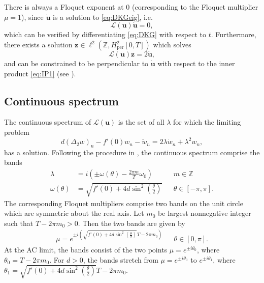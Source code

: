 \documentclass[12pt,reqno]{amsart}
\def\Z{{\mathbb Z}}
\def\per{\textrm{per}}
\def\calL{\mathcal{L}}
\newcommand{\uvec}{\mathbf{u}}
\newcommand{\zvec}{\mathbf{z}}
\begin{document}
There is always a Floquet exponent at 0 (corresponding to the Floquet multiplier $\mu = 1$), since $\dot{\uvec}$ is a solution to \cref{eq:DKGeig}, i.e.
\begin{equation}\label{eq:Lkernel1}
\calL(\uvec)\dot{\uvec} = 0,
\end{equation}
which can be verified by differentiating \cref{eq:DKG} with respect to $t$. Furthermore, there exists a solution $\zvec \in \ell^2(\Z, H^2_\per[0,T])$ which solves 
\begin{equation}
\calL(\uvec)\zvec = 2 \ddot{\uvec},
\end{equation}
and can be constrained to be perpendicular to $\dot{\uvec}$ with respect to the inner product \cref{eq:IP1} (see \cite[Section 3]{Pelinovsky2012}).

\subsection{Continuous spectrum}

The continuous spectrum of $\calL(\uvec)$ is the set of all $\lambda$ for which the limiting problem 
\begin{equation}\label{eq:DKGeigcont}
d (\Delta_2 w)_n - f'(0)w_n - \ddot{w}_n = 2 \lambda \dot{w}_n + \lambda^2 w_n,
\end{equation}
has a solution. Following the procedure in \cite[Section 2.1]{cuevas-maraver2016}, the continuous spectrum comprise the bands
\begin{equation}
\begin{aligned}
\lambda &= i\left( \pm \omega(\theta) - \frac{2 \pi m}{T} \omega_0 \right) && m \in \Z \\
\omega(\theta) &= \sqrt{ f'(0) + 4 d \sin^2\left( \frac{\theta}{2} \right) } && \theta \in [-\pi, \pi].
\end{aligned}
\end{equation}
The corresponding Floquet multipliers comprise two bands on the unit circle which are symmetric about the real axis. Let $m_0$ be largest nonnegative integer such that $T - 2 \pi m_0 > 0$. Then the two bands are given by
\begin{equation}
\begin{aligned}
\mu = e^{\pm i \left( \sqrt{f'(0) + 4 d \sin^2 \left(\frac{\theta}{2}\right) }T - 2 \pi m_0 \right) } && \theta \in [0, \pi].
\end{aligned}
\end{equation}
At the AC limit, the bands consist of the two points $\mu = e^{\pm i \theta_0}$, where $\theta_0 =  T - 2 \pi m_0$. For $d>0$, the bands stretch from $\mu = e^{\pm i \theta_0}$ to $e^{\pm i \theta_1}$, where $\theta_1 = \sqrt{f'(0) + 4 d \sin^2 \left(\frac{\theta}{2}\right) }T - 2 \pi m_0$. 
\end{document}
